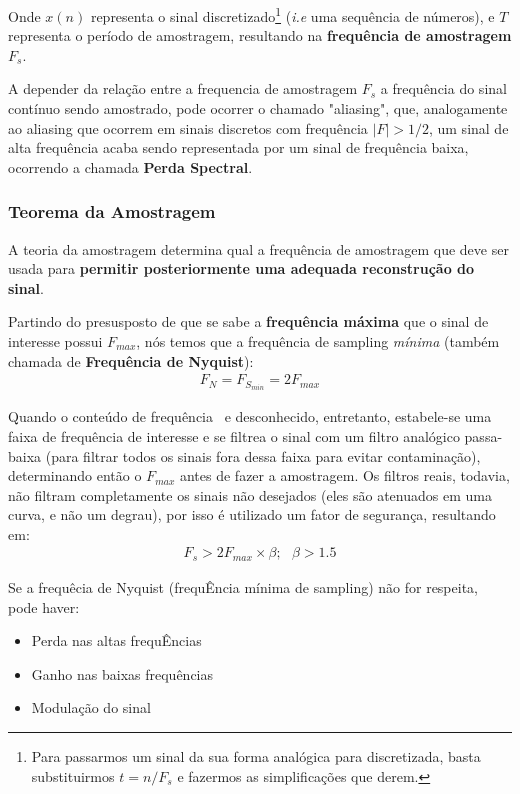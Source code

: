 \documentclass{article}
\begin{document}
Onde $x(n)$ representa o sinal discretizado\footnote{Para passarmos um sinal da sua forma analógica para discretizada, basta substituirmos $t = n/F_s$ e fazermos as simplificações que derem.} (\emph{i.e} uma sequência de números), e $T$ representa o período de amostragem, resultando na \textbf{frequência de amostragem} $F_s$.

A depender da relação entre a frequencia de amostragem $F_s$ a frequência do sinal contínuo sendo amostrado, pode ocorrer o chamado "aliasing", que, analogamente ao aliasing que ocorrem em sinais discretos com frequência $|F| > 1/2$, um sinal de alta frequência acaba sendo representada por um sinal de frequência baixa, ocorrendo a chamada \textbf{Perda Spectral}.

\subsubsection{Teorema da Amostragem}
A teoria da amostragem determina qual a frequência de amostragem que deve ser usada para \textbf{permitir posteriormente uma adequada reconstrução do sinal}.

Partindo do presusposto de que se sabe a \textbf{frequência máxima} que o sinal de interesse possui $F_{max}$, nós temos que a frequência de sampling \emph{mínima} (também chamada de \textbf{Frequência de Nyquist}):
\begin{align}
    F_N = F_{S_{min}} = 2F_{max}
    \label{eq:nyquist}
\end{align}

Quando o conteúdo de frequência ~e desconhecido, entretanto, estabele-se uma faixa de frequência de interesse e se filtrea o sinal com um filtro analógico passa-baixa (para filtrar todos os sinais fora dessa faixa para evitar contaminação), determinando então o $F_{max}$ antes de fazer a amostragem. Os filtros reais, todavia, não filtram completamente os sinais não desejados (eles são atenuados em uma curva, e não um degrau), por isso é utilizado um fator de segurança, resultando em:
\begin{align}
    F_s > 2F_{max} \times \beta; \ \ \ \beta > 1.5
\end{align}

\newpage
Se a frequêcia de Nyquist (frequÊncia mínima de sampling) não for respeita, pode haver:
\begin{itemize}
    \item Perda nas altas frequÊncias
    \item Ganho nas baixas frequências
    \item Modulação do sinal
\end{itemize}
\end{document}
